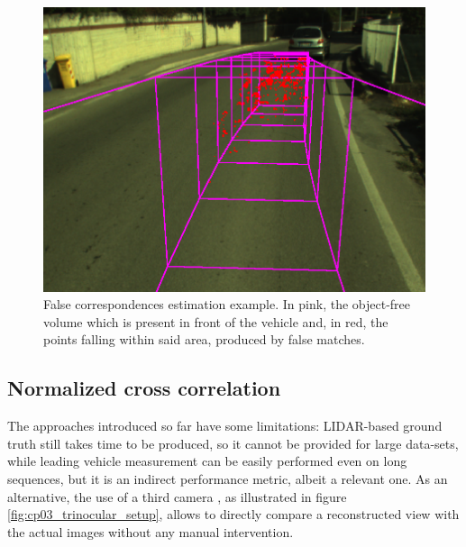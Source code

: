 \begin{figure}[h!]
\centering
\includegraphics{fc}
\caption{False correspondences estimation example. In pink, the object-free volume which is present in front of the vehicle and, in red, the points falling within said area, produced by false matches.}\label{fig:cp03_fc}
\end{figure}

\subsection{Normalized cross correlation}\label{ch:chapter03_03}

The approaches introduced so far have some limitations: LIDAR-based ground truth still takes time to be produced, so it cannot be provided for large data-sets, while leading vehicle measurement can be easily performed even on long sequences, but it is an indirect performance metric, albeit a relevant one. As an alternative, the use of a third camera \cite{Morales2009}, as illustrated in figure \ref{fig:cp03_trinocular_setup}, allows to directly compare a reconstructed view with the actual images without any manual intervention. 

